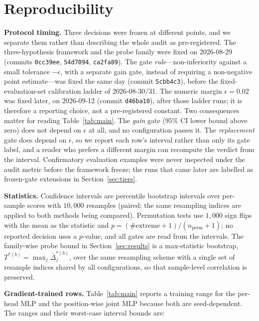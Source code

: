\documentclass[10pt]{article}
\begin{document}



\appendix

\section{Reproducibility}
\label{app:repro}
\textbf{Protocol timing.} Three decisions were frozen at different points, and
we separate them rather than describing the whole audit as pre-registered. The
three-hypothesis framework and the probe family were fixed on 2026-08-29
(commits \texttt{0cc39ee}, \texttt{54d7094}, \texttt{ca2fa89}). The gate
\emph{rule}---non-inferiority against a small tolerance $-\epsilon$, with a
separate gain gate, instead of requiring a non-negative point estimate---was
fixed the same day (commit \texttt{5cbb4c3}), before the fixed-evaluation-set
calibration ladder of 2026-08-30/31. The numeric margin $\epsilon{=}0.02$ was
fixed later, on 2026-09-12 (commit \texttt{d46ba10}), after those ladder runs;
it is therefore a reporting choice, not a pre-registered constant. Two
consequences matter for reading Table~\ref{tab:main}. The \emph{gain} gate
($95\%$ CI lower bound above zero) does not depend on $\epsilon$ at all, and no
configuration passes it. The \emph{replacement} gate does depend on $\epsilon$,
so we report each row's interval rather than only its gate label, and a reader
who prefers a different margin can recompute the verdict from the interval.
Confirmatory evaluation examples were never inspected under the audit metric
before the framework freeze; the runs that came later are labelled as
frozen-gate extensions in Section~\ref{sec:tiers}.

\textbf{Statistics.} Confidence intervals are percentile bootstrap intervals
over per-sample scores with $10{,}000$ resamples (paired: the same resampling
indices are applied to both methods being compared). Permutation tests use
$1{,}000$ sign flips with the mean as the statistic and
$p=(\#\text{extreme}+1)/(n_{\text{perm}}+1)$; no reported decision uses a
$p$-value, and all gates are read from the intervals. The family-wise probe
bound in Section~\ref{sec:results} is a max-statistic bootstrap, $T^{*(b)}=\max_j \bar\Delta_j^{*(b)}$, over the same resampling scheme with a
single set of resample indices shared by all configurations, so that sample-level correlation is preserved.

\textbf{Gradient-trained rows.} Table~\ref{tab:main} reports a training range
for the per-head MLP and the position-wise joint MLP because both are
seed-dependent. The ranges and their worst-case interval bounds are:
\end{document}
